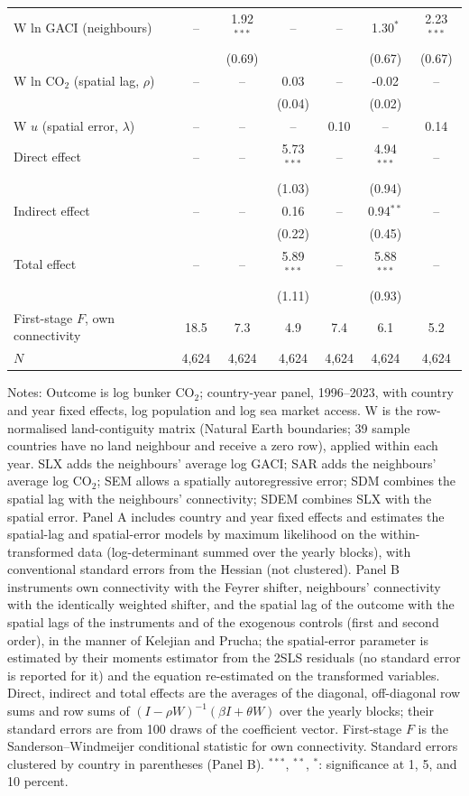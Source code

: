 \documentclass[12pt]{article}
\begin{document}
\begin{table}[H]
{\begin{threeparttable}
\begin{tabular}{lcccccc}
  W ln GACI (neighbours) & -- & 1.92$^{***}$ & -- & -- & 1.30$^{*}$ & 2.23$^{***}$ \\
   &  & (0.69) &  &  & (0.67) & (0.67) \\
  W ln CO$_2$ (spatial lag, $\rho$) & -- & -- & 0.03 & -- & -0.02 & -- \\
   &  &  & (0.04) &  & (0.02) &  \\
  W $u$ (spatial error, $\lambda$) & -- & -- & -- & 0.10 & -- & 0.14 \\
  Direct effect & -- & -- & 5.73$^{***}$ & -- & 4.94$^{***}$ & -- \\
   &  &  & (1.03) &  & (0.94) &  \\
  Indirect effect & -- & -- & 0.16 & -- & 0.94$^{**}$ & -- \\
   &  &  & (0.22) &  & (0.45) &  \\
  Total effect & -- & -- & 5.89$^{***}$ & -- & 5.88$^{***}$ & -- \\
   &  &  & (1.11) &  & (0.93) &  \\
  First-stage $F$, own connectivity & 18.5 & 7.3 & 4.9 & 7.4 & 6.1 & 5.2 \\
  $N$ & 4,624 & 4,624 & 4,624 & 4,624 & 4,624 & 4,624 \\
\bottomrule
\end{tabular}
\begin{tablenotes}[flushleft]
\footnotesize
\item Notes: Outcome is log bunker CO$_2$; country-year panel, 1996--2023, with country and year fixed effects, log population and log sea market access. W is the row-normalised land-contiguity matrix (Natural Earth boundaries; 39 sample countries have no land neighbour and receive a zero row), applied within each year. SLX adds the neighbours' average log GACI; SAR adds the neighbours' average log CO$_2$; SEM allows a spatially autoregressive error; SDM combines the spatial lag with the neighbours' connectivity; SDEM combines SLX with the spatial error. Panel A includes country and year fixed effects and estimates the spatial-lag and spatial-error models by maximum likelihood on the within-transformed data (log-determinant summed over the yearly blocks), with conventional standard errors from the Hessian (not clustered). Panel B instruments own connectivity with the Feyrer shifter, neighbours' connectivity with the identically weighted shifter, and the spatial lag of the outcome with the spatial lags of the instruments and of the exogenous controls (first and second order), in the manner of Kelejian and Prucha; the spatial-error parameter is estimated by their moments estimator from the 2SLS residuals (no standard error is reported for it) and the equation re-estimated on the transformed variables. Direct, indirect and total effects are the averages of the diagonal, off-diagonal row sums and row sums of $(I-\rho W)^{-1}(\beta I + \theta W)$ over the yearly blocks; their standard errors are from 100 draws of the coefficient vector. First-stage $F$ is the Sanderson--Windmeijer conditional statistic for own connectivity. Standard errors clustered by country in parentheses (Panel B). $^{***}$, $^{**}$, $^{*}$: significance at 1, 5, and 10 percent.

\end{tablenotes}
\end{threeparttable}}
\end{table}
\end{document}
